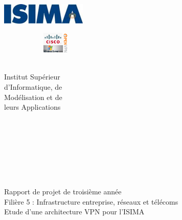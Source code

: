 \begin{titlepage}
	\begin{minipage}{0.5\textwidth}
		\begin{flushleft} \large
			\includegraphics[height=1cm]{images/logo-isima.png}\\
		\end{flushleft}
	\end{minipage}
	\begin{minipage}{0.43\textwidth}
		\begin{flushright} \large
 			\includegraphics[height=1cm,width=0.4\textwidth]{images/logo.png}\\%
		\end{flushright}
	\end{minipage}
	
	\begin{minipage}{0.5\textwidth}
		\begin{flushleft} \large
			~\\
			Institut Supérieur\\
			d'Informatique, de\\
			Modélisation et de\\
			leurs Applications
		\end{flushleft}
	\end{minipage}
	\begin{minipage}{0.415\textwidth}
		\begin{flushright} \large
			~\\
			~\\
			~\\
			~\\
			~
		\end{flushright}
	\end{minipage}

	\vfill
	\begin{center}
		\Hrule \\[0.4cm]
		\Large{Rapport de projet de troisième année}\\
		\Large Filière 5 : Infrastructure entreprise, réseaux et télécoms\\[1.2cm]
		\Huge{Etude d'une architecture VPN pour l'ISIMA}\\[0.4cm]
		\Hrule \\[0.4cm]
	\end{center}
	

\end{titlepage}
